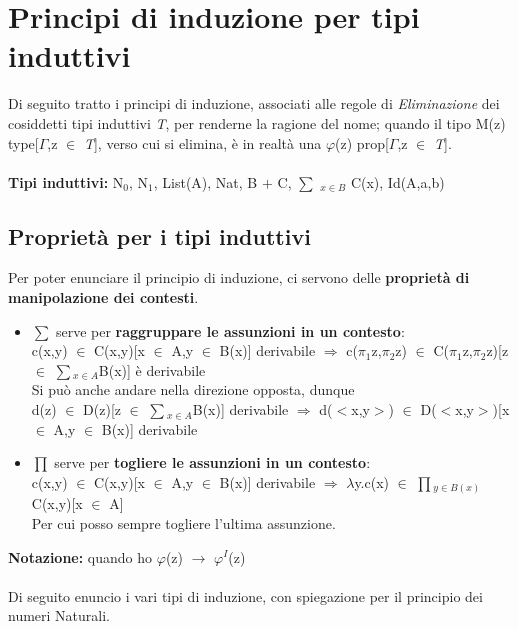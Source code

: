 \chapter{Principi di induzione per tipi induttivi}
\label{cap:principi-di-induzione-per-tipi-induttivi}
Di seguito tratto i principi di induzione, associati alle regole di \textit{Eliminazione} dei cosiddetti tipi induttivi \textit{T}, per renderne la ragione del nome; quando il tipo M(z) type[$\Gamma$,z $\in$ \textit{T}], verso cui si elimina, \`e in realt\`a una $\varphi$(z) prop[$\Gamma$,z $\in$ \textit{T}].\\\\
\noindent
\textbf{Tipi induttivi:} N$_0$, N$_1$, List(A), Nat, B $+$ C, {\scriptsize $\sum$} $_{x \in B}$ C(x), Id(A,a,b)

\section{Propriet\`a per i tipi induttivi}
\label{sec:prorieta-per-i-tipi-induttivi}
Per poter enunciare il principio di induzione, ci servono delle \textbf{propriet\`a di manipolazione dei contesti}.
\begin{itemize}
\item {\scriptsize $\sum$} serve per \textbf{raggruppare le assunzioni in un contesto}:\\
c(x,y) $\in$ C(x,y)[x $\in$ A,y $\in$ B(x)] derivabile $\Rightarrow$ c($\pi_1$z,$\pi_2$z) $\in$ C($\pi_1$z,$\pi_2$z)[z $\in$ {\scriptsize $\sum\limits$}$_{x \in A}$B(x)] \`e derivabile\\
Si pu\`o anche andare nella direzione opposta, dunque\\
d(z) $\in$ D(z)[z $\in$ {\scriptsize $\sum\limits$}$_{x \in A}$B(x)] derivabile $\Rightarrow$ d($<$x,y$>$) $\in$  D($<$x,y$>$)[x $\in$ A,y $\in$ B(x)] derivabile
\item {\scriptsize $\prod$} serve per \textbf{togliere le assunzioni in un contesto}:\\
c(x,y) $\in$ C(x,y)[x $\in$ A,y $\in$ B(x)] derivabile $\Rightarrow$ $\lambda$y.c(x) $\in$ {\scriptsize $\prod$}$_{y \in B(x)}$C(x,y)[x $\in$ A]\\
Per cui posso sempre togliere l'ultima assunzione.
\end{itemize}
\noindent
\textbf{Notazione:} quando ho $\varphi$(z) $\rightarrow$ $\varphi^I$(z) \\\\

\noindent
Di seguito enuncio i vari tipi di induzione, con spiegazione per il principio dei numeri Naturali.
